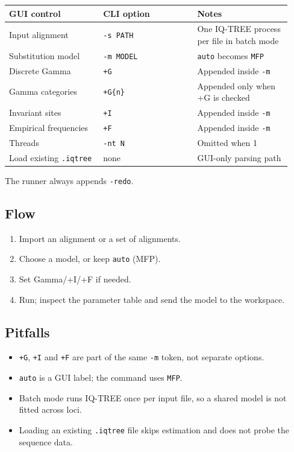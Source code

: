 \documentclass[11pt]{report}
\begin{document}
{\footnotesize
\begin{longtable}{@{}>{\raggedright\arraybackslash}p{0.31\linewidth}>{\raggedright\arraybackslash}p{0.31\linewidth}>{\raggedright\arraybackslash}p{0.31\linewidth}@{}}
\toprule
GUI control & CLI option & Notes \\
\midrule
\endhead
Input alignment & \texttt{-s PATH} & One IQ-TREE process per file in batch mode \\
Substitution model & \texttt{-m MODEL} & \texttt{auto} becomes \texttt{MFP} \\
Discrete Gamma & \texttt{+G} & Appended inside \texttt{-m} \\
Gamma categories & \texttt{+G\{n\}} & Appended only when +G is checked \\
Invariant sites & \texttt{+I} & Appended inside \texttt{-m} \\
Empirical frequencies & \texttt{+F} & Appended inside \texttt{-m} \\
Threads & \texttt{-nt N} & Omitted when 1 \\
Load existing \texttt{.\allowbreak iqtree} & none & GUI-only parsing path \\
\bottomrule
\end{longtable}
}

The runner always appends \texttt{-redo}.

\subsection{Flow}

\begin{enumerate}
  \item Import an alignment or a set of alignments.
  \item Choose a model, or keep \texttt{auto} (MFP).
  \item Set Gamma/+I/+F if needed.
  \item Run; inspect the parameter table and send the model to the workspace.
\end{enumerate}

\subsection{Pitfalls}

\begin{itemize}
  \item \texttt{+G}, \texttt{+I} and \texttt{+F} are part of the same \texttt{-m} token, not separate options.
  \item \texttt{auto} is a GUI label; the command uses \texttt{MFP}.
  \item Batch mode runs IQ-TREE once per input file, so a shared model is not fitted across loci.
  \item Loading an existing \texttt{.\allowbreak iqtree} file skips estimation and does not probe the sequence data.
\end{itemize}
\end{document}

